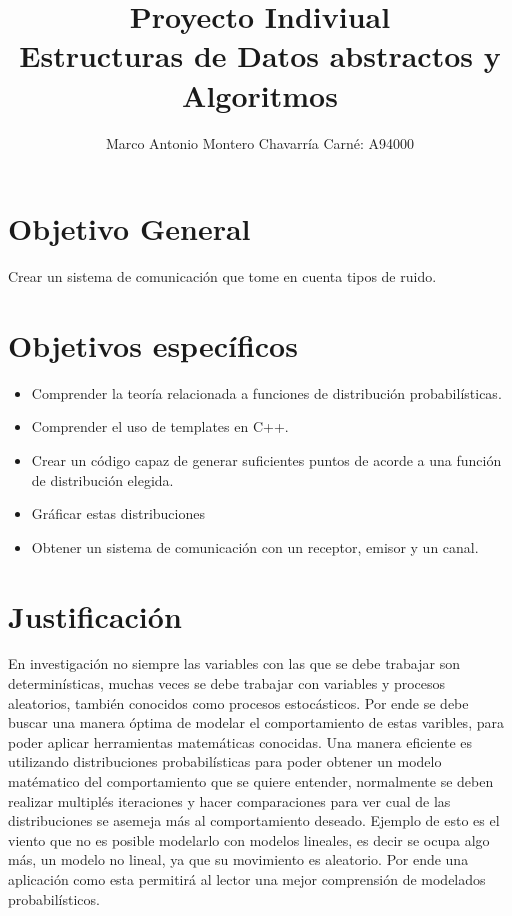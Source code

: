\documentclass[letterpaper]{article}
\begin{document}
\title{Proyecto Indiviual\\Estructuras de Datos abstractos y Algoritmos}
\author{
 Marco Antonio Montero Chavarría Carné: A94000\\
}
\maketitle

\newpage

\section*{Objetivo General}
Crear un sistema de comunicación que tome en cuenta tipos de ruido.

\section*{Objetivos específicos}
\begin{itemize}
\item Comprender la teoría relacionada a funciones de distribución probabilísticas.
\item Comprender el uso de templates en C++.
\item Crear un código capaz de generar suficientes puntos de acorde a una función de distribución elegida.
\item Gráficar estas distribuciones
\item Obtener un sistema de comunicación con un receptor, emisor y un canal.
\end{itemize}

\newpage

\section{Justificación}
 En investigación no siempre las variables con las que se debe trabajar son determinísticas, muchas veces se debe trabajar con variables y procesos aleatorios, también conocidos como procesos estocásticos. Por ende se debe buscar una manera óptima de modelar el comportamiento de estas varibles, para poder aplicar herramientas matemáticas conocidas.
 Una manera eficiente es utilizando distribuciones probabilísticas para poder obtener un modelo matématico del comportamiento que se quiere entender, normalmente se deben realizar multiplés iteraciones y hacer comparaciones para ver cual de las distribuciones se asemeja más al comportamiento deseado.
 Ejemplo de esto es el viento que no es posible modelarlo con modelos lineales, es decir se ocupa algo más, un modelo no lineal, ya que su movimiento es aleatorio. 
 Por ende una aplicación como esta permitirá al lector una mejor comprensión de modelados probabilísticos.
\end{document}
